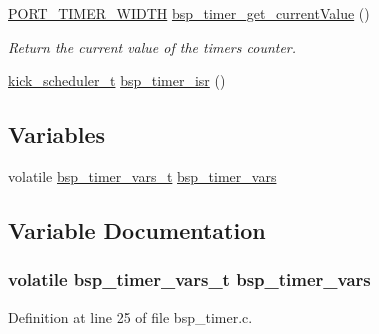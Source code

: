 \begin{DoxyCompactItemize}
\hyperlink{z1_2board__info_8h_abe66b9c1c60db84f2a99f2b827275f24}{P\+O\+R\+T\+\_\+\+T\+I\+M\+E\+R\+\_\+\+W\+I\+D\+TH} \hyperlink{group__bsp__timer_gae648940e8aa53efe781a7bbb056a9e50}{bsp\+\_\+timer\+\_\+get\+\_\+current\+Value} ()
\begin{DoxyCompactList}\small\item\em Return the current value of the timer\textquotesingle{}s counter. \end{DoxyCompactList}\item 
\hyperlink{group__board_gac9ebdcc0a4f3c8422f5f4f0fbbe0ded0}{kick\+\_\+scheduler\+\_\+t} \hyperlink{group__bsp__timer_ga1e6f08f2808b6c73ae3ee4d31346abb9}{bsp\+\_\+timer\+\_\+isr} ()
\end{DoxyCompactItemize}
\subsection*{Variables}
\begin{DoxyCompactItemize}
\item 
volatile \hyperlink{structbsp__timer__vars__t}{bsp\+\_\+timer\+\_\+vars\+\_\+t} \hyperlink{iot-lab___a8-_m3_2bsp__timer_8c_aa4dd022c85bc113e518f8d4418ffbe31}{bsp\+\_\+timer\+\_\+vars}
\end{DoxyCompactItemize}


\subsection{Variable Documentation}
\subsubsection[{\texorpdfstring{bsp\+\_\+timer\+\_\+vars}{bsp_timer_vars}}]{\setlength{\rightskip}{0pt plus 5cm}volatile {\bf bsp\+\_\+timer\+\_\+vars\+\_\+t} bsp\+\_\+timer\+\_\+vars}\hypertarget{iot-lab___a8-_m3_2bsp__timer_8c_aa4dd022c85bc113e518f8d4418ffbe31}{}\label{iot-lab___a8-_m3_2bsp__timer_8c_aa4dd022c85bc113e518f8d4418ffbe31}


Definition at line 25 of file bsp\+\_\+timer.\+c.

